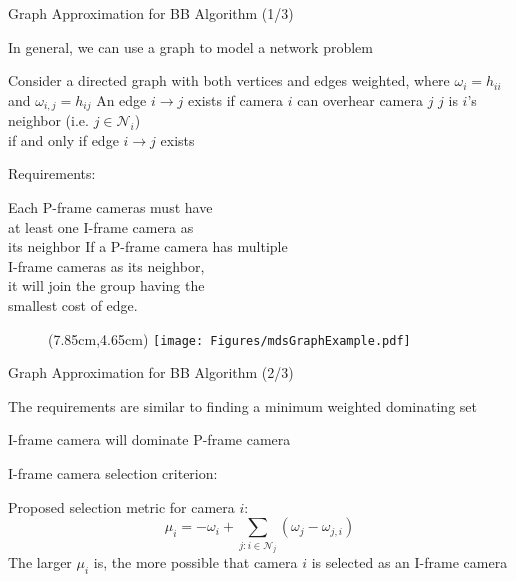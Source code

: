 \begin{frame}{Graph Approximation for BB Algorithm (1/3)}
\begin{itemize}
	\myItem In general, we can use a graph to model a network problem
	\begin{itemize}
		\mySubItem Consider a directed graph with both vertices and edges weighted, where $\omega_i = h_{ii}$ and $\omega_{i,j} = h_{ij}$
		\mySubItem An edge $i \rightarrow j$ exists if camera $i$ can overhear camera $j$
		\mySubItem $j$ is $i$'s neighbor (i.e. $j \in \mathcal{N}_i$) \\
				   if and only if edge
				   $i \rightarrow j$ exists
	\end{itemize}
\end{itemize}
%
\begin{itemize}
	\myItem Requirements:
	\begin{itemize}
		\mySubItem Each P-frame cameras must have \\
				   at least one I-frame camera as \\
				   its neighbor
		\mySubItem If a P-frame camera has multiple \\
		 		   I-frame cameras as its neighbor, \\
		 		   it will join the group having the \\
		 		   smallest cost of edge.
	\end{itemize}
\end{itemize}
%
\begin{figure}
\centering
\begin{textblock*}{1cm}(7.85cm,4.65cm) %
\texttt{[image: Figures/mdsGraphExample.pdf]}
\end{textblock*}
\end{figure}
%
\end{frame}
\begin{frame}{Graph Approximation for BB Algorithm (2/3)}
\begin{itemize}
	\myItem The requirements are similar to finding a minimum weighted dominating set
	\begin{itemize}
		\mySubItem I-frame camera will dominate P-frame camera
	\end{itemize}
	\myItem I-frame camera selection criterion:
	\begin{itemize}
		\mySubItem Proposed selection metric for camera $i$:
		\begin{equation}
			\mu_i = - \omega_i + \sum_{j:i \in \mathcal{N}_j} \left( \omega_j - \omega_{j,i} \right)
			\label{eq::graphSelectionMetric}
		\end{equation}
		\mySubItem The larger $\mu_i$ is, the more possible that camera $i$ is selected as an I-frame camera
	\end{itemize}
\end{itemize}
\end{frame}
